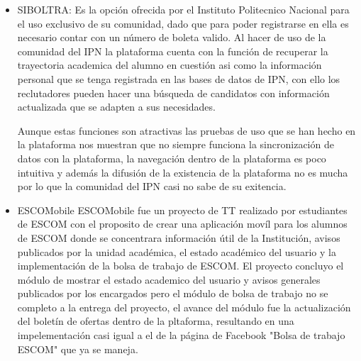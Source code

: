 \begin{itemize}
    \item SIBOLTRA:
    Es la opción ofrecida por el Instituto Politecnico Nacional para el uso exclusivo de su comunidad, dado que para poder registrarse en ella es necesario contar con un número de boleta valido. Al hacer de uso de la comunidad del IPN la plataforma cuenta con la función de recuperar la trayectoria academica del alumno en cuestión asi como la información personal que se tenga registrada en las bases de datos de IPN, con ello los reclutadores pueden hacer una búsqueda de candidatos con información actualizada que se adapten a sus necesidades.
    
    Aunque estas funciones son atractivas las pruebas de uso que se han hecho en la plataforma nos muestran que no siempre funciona la sincronización de datos con la plataforma, la navegación dentro de la plataforma es poco intuitiva y además la difusión de la existencia de la plataforma no es mucha por lo que la comunidad del IPN casi no sabe de su exitencia.
    
    \item ESCOMobile
    ESCOMobile fue un proyecto de TT realizado por estudiantes de ESCOM con el proposito de crear una aplicación movíl para los alumnos de ESCOM donde se concentrara información útil de la Institución, avisos publicados por la unidad académica, el estado académico del usuario y la implementación de la bolsa de trabajo de ESCOM. El proyecto concluyo  el módulo de mostrar el estado academico del usuario y avisos generales publicados por los encargados pero el módulo de bolsa de trabajo no se completo a la entrega del proyecto, el avance del módulo fue la actualización del boletín de ofertas dentro de la pltaforma, resultando en una impelementación casi igual a el de la página de Facebook "Bolsa de trabajo ESCOM" que ya se maneja.
    
\end{itemize}

